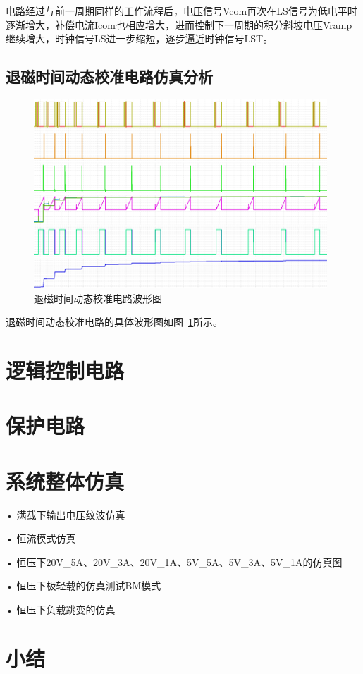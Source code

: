 电路经过与前一周期同样的工作流程后，电压信号Vcom再次在LS信号为低电平时逐渐增大，补偿电流Icom也相应增大，进而控制下一周期的积分斜坡电压Vramp继续增大，时钟信号LS进一步缩短，逐步逼近时钟信号LST。

\subsection{退磁时间动态校准电路仿真分析}


\begin{figure}[htbp] 
    \centering
    \includegraphics[width=0.8\linewidth]{figures/退磁时间技术仿真图.png}
    \caption{退磁时间动态校准电路波形图}
    \label{fig:退磁时间动态校准电路波形图}
\end{figure}

退磁时间动态校准电路的具体波形图如图~\ref{fig:退磁时间动态校准电路波形图}所示。










\section{逻辑控制电路}

\section{保护电路}

\section{系统整体仿真}

• 满载下输出电压纹波仿真

• 恒流模式仿真

• 恒压下20V\_5A、20V\_3A、20V\_1A、5V\_5A、5V\_3A、5V\_1A的仿真图

• 恒压下极轻载的仿真测试BM模式

• 恒压下负载跳变的仿真



\section{小结}




